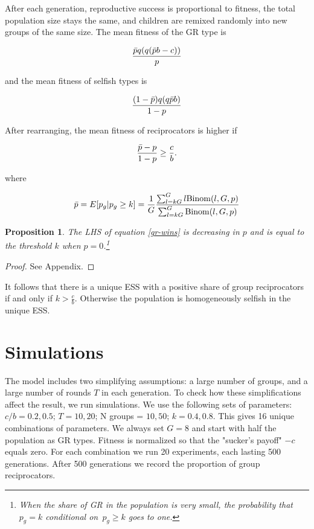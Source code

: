\documentclass[12pt,a4paper]{article}
\newtheorem{prop}[theo]{Proposition}
\begin{document}
After each generation, reproductive success is proportional to fitness, the total population size stays the same, and children are remixed randomly into new groups of the same size.
%
The mean fitness of the GR type is

\begin{equation*}
\frac{
  \bar{p} q(q(\bar{p} b - c))
}{
  p
}
\end{equation*}

and the mean fitness of selfish types is

\begin{equation*}
\frac{
  (1 - \bar{p})q(q\bar{p} b)
}{
  1 - p
}
\end{equation*}

After rearranging, the mean fitness of reciprocators is higher if


\begin{equation}
\label{gr-wins}
\frac{ \bar{p} - p}{ 1 - p} \ge \frac{c}{b}.
\end{equation}

where 

\[
\bar{p} = E[p_g | p_g \ge k] = \frac{1}{G} \frac{\sum_{l=kG}^G l \mathrm{Binom}(l,G,p)}{\sum_{l=kG}^G \mathrm{Binom}(l,G,p)}
\]

\begin{prop}
\label{prop:decrease_in_p}
    The LHS of equation \eqref{gr-wins} is decreasing in $p$ and is equal
to the threshold $k$ when $p = 0$.\footnote{
    When the share of GR in the population is very small, the probability that $p_g = k$ conditional on~$p_g\geq k$ goes to one.
}
\end{prop}

\begin{proof}
    See Appendix.
\end{proof}

It follows that there is a unique ESS with a positive share of group
reciprocators if and only if $k > \frac{c}{b}$. Otherwise the population is homogeneously selfish in the unique ESS.

\section{Simulations}

The model includes two simplifying assumptions: a large number of groups, and a large
number of rounds $T$ in each generation. To check how these simplifications affect
the result, we run simulations. We use the following sets of parameters:
$c/b = 0.2, 0.5$; $T = 10, 20$; N groups = $10, 50$; $k = 0.4, 0.8$. This gives
16 unique combinations of parameters. We always set $G = 8$ and start with
half the population as GR types. Fitness is normalized so that the "sucker's payoff"
$-c$ equals zero. For each combination we run 20 experiments, 
each lasting 500 generations. After 500 generations we record the proportion of 
group reciprocators. 
\end{document}
